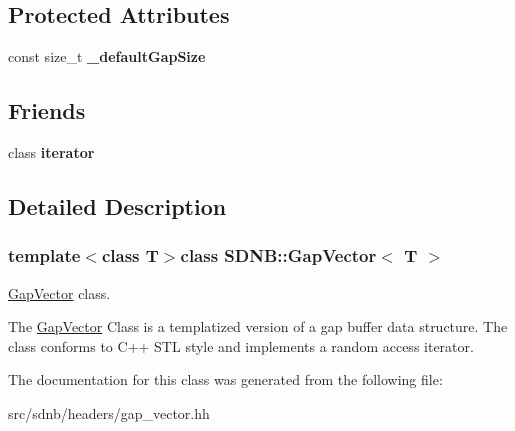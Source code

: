 \subsection*{Protected Attributes}
\begin{DoxyCompactItemize}
\item 
\hypertarget{classSDNB_1_1GapVector_a279ce160457349d958452816dfa6d9cf}{}const size\+\_\+t {\bfseries \+\_\+default\+Gap\+Size}\label{classSDNB_1_1GapVector_a279ce160457349d958452816dfa6d9cf}

\end{DoxyCompactItemize}
\subsection*{Friends}
\begin{DoxyCompactItemize}
\item 
\hypertarget{classSDNB_1_1GapVector_a67171474c4da6cc8efe0c7fafefd2b2d}{}class {\bfseries iterator}\label{classSDNB_1_1GapVector_a67171474c4da6cc8efe0c7fafefd2b2d}

\end{DoxyCompactItemize}


\subsection{Detailed Description}
\subsubsection*{template$<$class T$>$class S\+D\+N\+B\+::\+Gap\+Vector$<$ T $>$}

\hyperlink{classSDNB_1_1GapVector}{Gap\+Vector} class. 

The \hyperlink{classSDNB_1_1GapVector}{Gap\+Vector} Class is a templatized version of a gap buffer data structure. The class conforms to C++ S\+T\+L style and implements a random access iterator. 

The documentation for this class was generated from the following file\+:\begin{DoxyCompactItemize}
\item 
src/sdnb/headers/gap\+\_\+vector.\+hh\end{DoxyCompactItemize}
